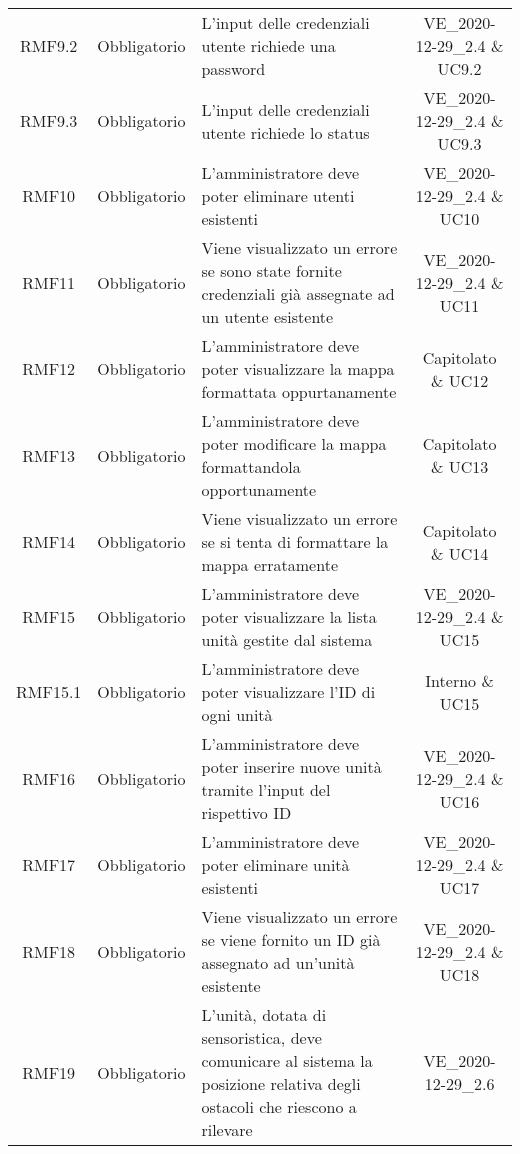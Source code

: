 \begin{longtable}[h!] { c c m{8cm} c}
		RMF9.2 & Obbligatorio & L'input delle credenziali utente richiede una password & VE_2020-12-29_2.4 \& UC9.2 \\

		RMF9.3 & Obbligatorio & L'input delle credenziali utente richiede lo status & VE_2020-12-29_2.4 \& UC9.3 \\
		
		RMF10 & Obbligatorio & L'amministratore deve poter eliminare utenti esistenti & VE_2020-12-29_2.4 \& UC10 \\

		RMF11 & Obbligatorio & Viene visualizzato un errore se sono state fornite credenziali già assegnate ad un utente esistente & VE_2020-12-29_2.4 \& UC11 \\

		RMF12 & Obbligatorio & L'amministratore deve poter visualizzare la mappa formattata oppurtanamente & Capitolato \& UC12 \\

		RMF13 & Obbligatorio & L'amministratore deve poter modificare la mappa formattandola opportunamente & Capitolato \& UC13 \\

		RMF14 & Obbligatorio & Viene visualizzato un errore se si tenta di formattare la mappa erratamente & Capitolato \& UC14 \\

		RMF15 & Obbligatorio & L'amministratore deve poter visualizzare la lista unità gestite dal sistema & VE_2020-12-29_2.4 \& UC15 \\

		RMF15.1 & Obbligatorio & L'amministratore deve poter visualizzare l'ID di ogni unità & Interno \& UC15 \\

		RMF16 & Obbligatorio & L'amministratore deve poter inserire nuove unità tramite l'input del rispettivo ID & VE_2020-12-29_2.4 \& UC16 \\

		RMF17& Obbligatorio & L'amministratore deve poter eliminare unità esistenti & VE_2020-12-29_2.4 \& UC17 \\

		RMF18 & Obbligatorio & Viene visualizzato un errore se viene fornito un ID già assegnato ad un'unità esistente & VE_2020-12-29_2.4 \& UC18 \\

		RMF19 & Obbligatorio & L'unità, dotata di sensoristica, deve comunicare al sistema la posizione relativa degli ostacoli che riescono a rilevare & VE_2020-12-29_2.6 \\


\end{longtable}
